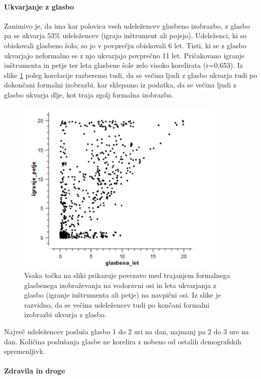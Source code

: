 \documentclass[a4paper, 12pt]{book}
\begin{document}
{\paragraph{Ukvarjanje z glasbo}

Zanimivo je, da ima kar polovica vseh udeležencev glasbeno izobrazbo, z glasbo pa se ukvarja 53\% udeležencev (igrajo inštrument ali pojejo). Udeleženci, ki so obiskovali glasbeno šolo, so jo v povprečju obiskovali 6 let. Tisti, ki se z glasbo ukvarjajo neformalno se z njo ukvarjajo povprečno 11 let. Pričakovano igranje inštrumenta in petje ter leta glasbene šole zelo visoko korelirata (r=0,653). Iz slike \ref{ukvarjanjeglizobrazba} poleg korelacije razberemo tudi, da se večina ljudi z glasbo ukvarja tudi po dokončani formalni izobrazbi, kar sklepamo iz podatka, da se večina ljudi z glasbo ukvarja dlje, kot traja zgolj formalna izobrazba. 

\begin{figure}[hbt]
\centering
\includegraphics[width=10cm]{images/izobrazba_ukvarjanje.png}

\caption{Vsaka točka na sliki prikazuje povezavo med trajanjem formalnega glasbenega izobraževanja na vodoravni osi in leta ukvarjanja z glasbo (igranje inštrumenta ali petje) na navpični osi.  Iz slike je razvidno, da se večina udeležencev tudi po končani formalni izobrazbi ukvarja z glasbo.  }
\label{ukvarjanjeglizobrazba}
\end{figure}

Največ udeležencev posluša glasbo 1 do 2 uri na dan, najmanj pa 2 do 3 ure na dan. Količina poslušanja glasbe ne korelira z nobeno od ostalih demografskih spremenljivk. 

\paragraph{Zdravila in droge}

}
\end{document}
